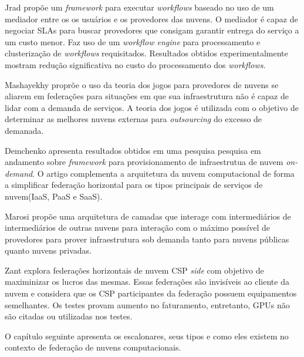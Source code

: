 Jrad \cite{Jrad:2013:BFM:2462326.2462339} propõe um \textit{framework} para executar \textit{workflows} baseado no uso de um mediador entre os os usuários e os provedores das nuvens. O mediador é capaz de negociar \acrshort{SLA}s para buscar provedores que consigam garantir entrega do serviço a um custo menor. Faz uso de um \textit{workflow engine} para processamento e clusterização de \textit{workflows} requisitados. Resultados obtidos experimentalmente mostram redução significativa no custo do processamento dos \textit{workflows}.

Mashayekhy \cite{6853386} proprõe o uso da teoria dos jogos para provedores de nuvens se aliarem em federações para situações em que sua infraestrutura não é capaz de lidar com a demanda de serviços. A teoria dos jogos é utilizada com o objetivo de determinar as melhores nuvens externas para \textit{outsourcing} do excesso de demanada.

Demchenko \cite{6427607} apresenta resultados obtidos em uma pesquisa pesquisa em andamento sobre \textit{framework} para provisionamento de infraestrutua de nuvem \textit{on-demand}. O artigo complementa a arquitetura da nuvem computacional de forma a simplificar federação horizontal para os tipos principais de serviços de nuvem(\acrshort{IaaS}, \acrshort{PaaS} e \acrshort{SaaS}).

Marosi \cite{FCM} propõe uma arquitetura de camadas que interage com intermediários de intermediários de outras nuvens para interação com o máximo possível de provedores para prover infraestrutura sob demanda tanto para nuvens públicas quanto nuvens privadas.

Zant \cite{6814036} explora federações horizontais de nuvem \acrfull{CSP} \textit{side} com objetivo de maximinizar os lucros das mesmas. Essas federações são invisíveis ao cliente da nuvem e considera que os \acrshort{CSP} participantes da federação possuem equipamentos semelhantes. Os testes provam aumento no faturamento, entretanto, \acrshort{GPU}s não são citadas ou utilizadas nos testes.



O capítulo seguinte apresenta os escalonares, seus tipos e como eles existem no contexto de federação de nuvens computacionais.

